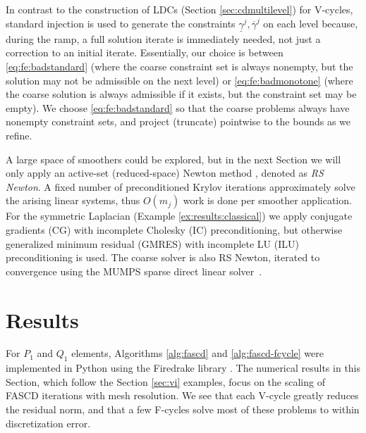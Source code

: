 \documentclass[review,hidelinks,onefignum,onetabnum]{siamart220329}
\begin{document}
In contrast to the construction of LDCs (Section \ref{sec:cdmultilevel}) for V-cycles, standard injection is used to generate the constraints $\underline{\gamma}^j,\overline{\gamma}^j$ on each level because, during the ramp, a full solution iterate is immediately needed, not just a correction to an initial iterate.  Essentially, our choice is between \eqref{eq:fe:badstandard} (where the coarse constraint set is always nonempty, but the solution may not be admissible on the next level) or \eqref{eq:fe:badmonotone} (where the coarse solution is always admissible if it exists, but the constraint set may be empty). We choose \eqref{eq:fe:badstandard} so that the coarse problems always have nonempty constraint sets, and project (truncate) pointwise to the bounds as we refine.

A large space of smoothers could be explored, but in the next Section we will only apply an active-set (reduced-space) Newton method \cite{Balayetal2023,BensonMunson2006}, denoted as \emph{RS Newton}.  A fixed number of preconditioned Krylov iterations approximately solve the arising linear systems, thus $O(m_j)$ work is done per smoother application.  For the symmetric Laplacian (Example \ref{ex:results:classical}) we apply conjugate gradients (CG) with incomplete Cholesky (IC) preconditioning, but otherwise generalized minimum residual (GMRES) with incomplete LU (ILU) preconditioning is used.  The coarse solver is also RS Newton, iterated to convergence using the MUMPS sparse direct linear solver~\cite{Amestoy2001}.


\section{Results} \label{sec:results}

For $P_1$ and $Q_1$ elements, Algorithms \ref{alg:fascd} and \ref{alg:fascd-fcycle} were implemented in Python using the Firedrake library \cite{Rathgeberetal2016}.  The numerical results in this Section, which follow the Section \ref{sec:vi} examples, focus on the scaling of FASCD iterations with mesh resolution.  We see that each V-cycle greatly reduces the residual norm, and that a few F-cycles solve most of these problems to within discretization error.
\end{document}
